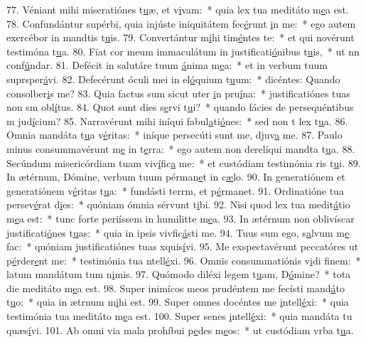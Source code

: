 77. Véniant mihi miseratiónes t\uline{u}æ, et v\uline{i}vam:~* quia lex tua meditáto m\uline{e}a est.
78. Confundántur supérbi, quia injúste iniquitátem fec\uline{é}runt \uline{i}n me:~* ego autem exercébor in mandtis t\uline{u}is.
79. Convertántur m\uline{i}hi tim\uline{é}ntes te:~* et qui novérunt testimóna t\uline{u}a.
80. Fiat cor meum immaculátum in justificati\uline{ó}nibus t\uline{u}is,~* ut nn conf\uline{ú}ndar.
81. Defécit in salutáre tuum \uline{á}nima m\uline{e}a:~* et in verbum tuum suprsper\uline{á}vi.
82. Defecérunt óculi mei in el\uline{ó}quium t\uline{u}um:~* dicéntes: Quando consolber\uline{i}s me?
83. Quia factus sum sicut uter \uline{i}n pru\uline{í}na:~* justificatiónes tuas non sm obl\uline{í}tus.
84. Quot sunt dies s\uline{e}rvi t\uline{u}i?~* quando fácies de persequéntibus m jud\uline{í}cium?
85. Narravérunt mihi iníqui fabul\uline{a}ti\uline{ó}nes:~* sed non t lex t\uline{u}a.
86. Omnia mandáta t\uline{u}a v\uline{é}ritas:~* iníque persecúti sunt me, djuv\uline{a} me.
87. Paulo minus consummavérunt m\uline{e} in t\uline{e}rra:~* ego autem non derelíqui mandta t\uline{u}a.
88. Secúndum misericórdiam tuam viv\uline{í}fic\uline{a} me:~* et custódiam testimónia ris t\uline{u}i.
89. In ætérnum, Dómine, verbum tuum pérman\uline{e}t in c\uline{æ}lo.
90. In generatiónem et generatiónem v\uline{é}ritas t\uline{u}a:~* fundásti terrm, et p\uline{é}rmanet.
91. Ordinatióne tua persev\uline{é}rat d\uline{i}es:~* quóniam ómnia sérvunt t\uline{i}bi.
92. Nisi quod lex tua medit\uline{á}tio m\uline{e}a est:~* tunc forte periíssem in humilitte m\uline{e}a.
93. In ætérnum non oblivíscar justificati\uline{ó}nes t\uline{u}as:~* quia in ipsis vivfic\uline{á}sti me.
94. Tuus sum ego, s\uline{a}lvum m\uline{e} fac:~* quóniam justificatiónes tuas xquis\uline{í}vi.
95. Me exspectavérunt peccatóres ut p\uline{é}rder\uline{e}nt me:~* testimónia tua ntell\uline{é}xi.
96. Omnis consummatiónis v\uline{i}di f\uline{i}nem:~* latum mandátum tum n\uline{i}mis.
97. Quómodo diléxi legem t\uline{u}am, D\uline{ó}mine?~* tota die meditáto m\uline{e}a est.
98. Super inimícos meos prudéntem me fecísti mand\uline{á}to t\uline{u}o:~* quia in ætrnum m\uline{i}hi est.
99. Super omnes docéntes me \uline{i}ntell\uline{é}xi:~* quia testimónia tua meditáto m\uline{e}a est.
100. Super senes \uline{i}ntell\uline{é}xi:~* quia mandáta tu quæs\uline{í}vi.
101. Ab omni via mala prohíbui p\uline{e}des m\uline{e}os:~* ut custódiam vrba t\uline{u}a.
